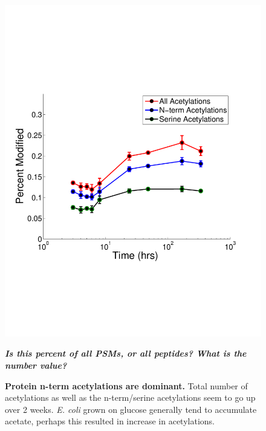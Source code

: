 \documentclass[12pt]{article}
\begin{document}
\clearpage
\begin{figure}[p]
\centerline{\includegraphics[width=5in]{Figures/Acetylation_AAs.pdf}}
\caption{\label{fig:Acet}\textbf{Protein n-term acetylations are dominant.} Total number of acetylations as well as the n-term/serine acetylations seem to go up over 2 weeks. \emph{E. coli} grown on glucose generally tend to accumulate acetate, perhaps this resulted in increase in acetylations.}\textbf{\emph{Is this percent of all PSMs, or all peptides?  What is the number value?}}
\end{figure}
\end{document}
